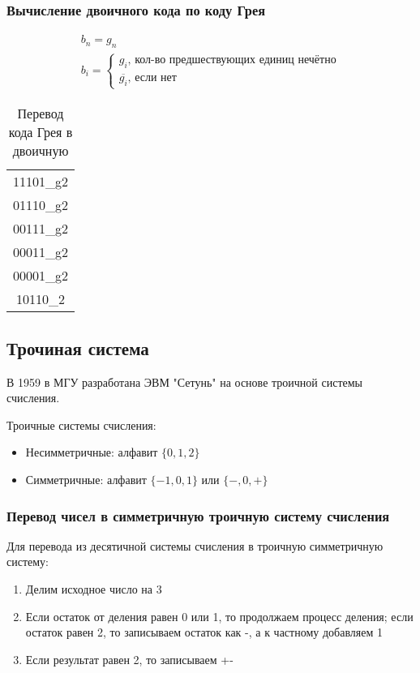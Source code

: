 \subsubsection{Вычисление двоичного кода по коду Грея}

\begin{gather*}
  b_n = g_n \\
  b_i = \begin{cases}
    g_i \text{, кол-во предшествующих единиц нечётно} \\
    \overline{g_i} \text{, если нет}
  \end{cases}
\end{gather*}

\begin{table}[htpb]
  \centering
  \caption{Перевод кода Грея в двоичную}
  \begin{tabular}{ c }
    11101_{g2} \\
    01110_{g2} \\
    00111_{g2} \\
    00011_{g2} \\
    00001_{g2} \\
    \hline 
    10110_2 \\
  \end{tabular}
\end{table}

\subsection{Трочиная система}

В 1959 в МГУ разработана ЭВМ "Сетунь" на основе троичной системы счисления.

Троичные системы счисления:
\begin{itemize}
  \item Несимметричные: алфавит $\{0, 1, 2\}$ 
  \item Симметричные: алфавит $\{-1, 0, 1\}$ или $\{-, 0, +\}$
\end{itemize}

\subsubsection{Перевод чисел в симметричную троичную систему счисления}

Для перевода из десятичной системы счисления в троичную симметричную систему:
\begin{enumerate}
  \item Делим исходное число на 3
  \item Если остаток от деления равен 0 или 1, то продолжаем процесс деления; если остаток равен 2, то записываем остаток как -, а к частному добавляем 1
  \item Если результат равен 2, то записываем +-
\end{enumerate}

